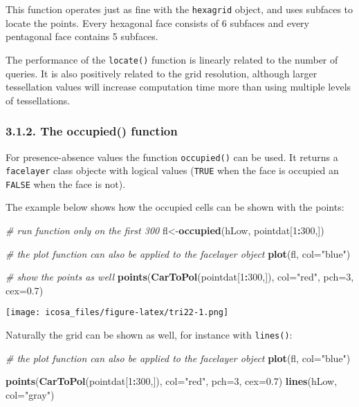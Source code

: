 \documentclass[]{article}
\newenvironment{Shaded}{\begin{snugshade}}{\end{snugshade}}
\newcommand{\KeywordTok}[1]{\textcolor[rgb]{0.13,0.29,0.53}{\textbf{#1}}}
\newcommand{\DataTypeTok}[1]{\textcolor[rgb]{0.13,0.29,0.53}{#1}}
\newcommand{\DecValTok}[1]{\textcolor[rgb]{0.00,0.00,0.81}{#1}}
\newcommand{\FloatTok}[1]{\textcolor[rgb]{0.00,0.00,0.81}{#1}}
\newcommand{\StringTok}[1]{\textcolor[rgb]{0.31,0.60,0.02}{#1}}
\newcommand{\CommentTok}[1]{\textcolor[rgb]{0.56,0.35,0.01}{\textit{#1}}}
\newcommand{\OperatorTok}[1]{\textcolor[rgb]{0.81,0.36,0.00}{\textbf{#1}}}
\newcommand{\NormalTok}[1]{#1}
\begin{document}
This function operates just as fine with the \texttt{hexagrid} object,
and uses subfaces to locate the points. Every hexagonal face consists of
6 subfaces and every pentagonal face contains 5 subfaces.

The performance of the \texttt{locate()} function is linearly related to
the number of queries. It is also positively related to the grid
resolution, although larger tessellation values will increase
computation time more than using multiple levels of tessellations.

\subsubsection{3.1.2. The occupied()
function}\label{the-occupied-function}

For presence-absence values the function \texttt{occupied()} can be
used. It returns a \texttt{facelayer} class objecte with logical values
(\texttt{TRUE} when the face is occupied an \texttt{FALSE} when the face
is not).

The example below shows how the occupied cells can be shown with the
points:

\begin{Shaded}
\begin{Highlighting}[]
\CommentTok{# run function only on the first 300}
\NormalTok{fl<-}\KeywordTok{occupied}\NormalTok{(hLow, pointdat[}\DecValTok{1}\OperatorTok{:}\DecValTok{300}\NormalTok{,])}

\CommentTok{# the plot function can also be applied to the facelayer object}
\KeywordTok{plot}\NormalTok{(fl, }\DataTypeTok{col=}\StringTok{"blue"}\NormalTok{)}

\CommentTok{# show the points as well}
\KeywordTok{points}\NormalTok{(}\KeywordTok{CarToPol}\NormalTok{(pointdat[}\DecValTok{1}\OperatorTok{:}\DecValTok{300}\NormalTok{,]), }\DataTypeTok{col=}\StringTok{"red"}\NormalTok{, }\DataTypeTok{pch=}\DecValTok{3}\NormalTok{, }\DataTypeTok{cex=}\FloatTok{0.7}\NormalTok{)}
\end{Highlighting}
\end{Shaded}

\texttt{[image: icosa\_files/figure-latex/tri22-1.png]}

Naturally the grid can be shown as well, for instance with
\texttt{lines()}:

\begin{Shaded}
\begin{Highlighting}[]
\CommentTok{# the plot function can also be applied to the facelayer object}
\KeywordTok{plot}\NormalTok{(fl, }\DataTypeTok{col=}\StringTok{"blue"}\NormalTok{)}

\KeywordTok{points}\NormalTok{(}\KeywordTok{CarToPol}\NormalTok{(pointdat[}\DecValTok{1}\OperatorTok{:}\DecValTok{300}\NormalTok{,]), }\DataTypeTok{col=}\StringTok{"red"}\NormalTok{, }\DataTypeTok{pch=}\DecValTok{3}\NormalTok{, }\DataTypeTok{cex=}\FloatTok{0.7}\NormalTok{)}
\KeywordTok{lines}\NormalTok{(hLow, }\DataTypeTok{col=}\StringTok{"gray"}\NormalTok{)}
\end{Highlighting}
\end{Shaded}
\end{document}
